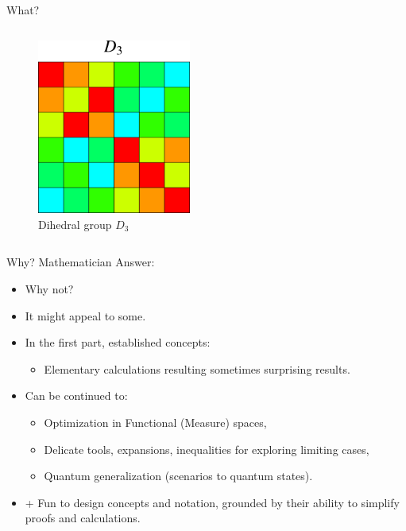 \documentclass{beamer}
\theoremstyle{definition}
\begin{document}
\begin{frame}{What?}
\begin{columns}
\begin{column}{0.3\textwidth}
        \begin{figure}
    \centering
        \includegraphics[width=0.45\textwidth]{img/DihedralGroupD3Table.png}
        \caption{\small \centering Dihedral group $D_3$}
    \end{figure}
\end{column}
        

\end{columns}

\end{frame}





\begin{frame}{Why? Mathematician Answer:}

\begin{itemize}
    \item Why not?
    \item It might appeal to some.
    \item In the first part, established concepts:
    \begin{itemize}
        \item Elementary calculations resulting sometimes surprising results.
    \end{itemize}
    \item Can be continued to:
    \begin{itemize}
        \item Optimization in Functional (Measure) spaces,
        \item Delicate tools, expansions, inequalities for exploring limiting cases,
        \item Quantum generalization (scenarios to quantum states).
    \end{itemize}
    \item + Fun to design concepts and notation, grounded by their ability to simplify proofs and calculations.
\end{itemize}



\end{frame}
\end{document}
